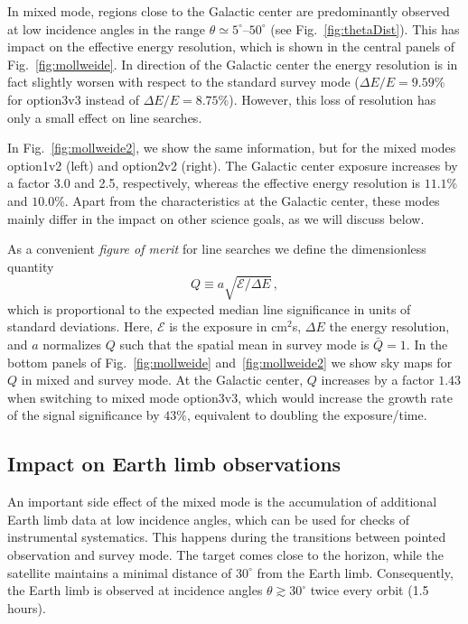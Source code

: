 \documentclass[aps,prd,superscriptaddress,nofootinbib,fixlfloat, 12pt]{revtex4-1}
\begin{document}
In mixed mode, regions close to the Galactic center are predominantly observed
at low incidence angles in the range $\theta\simeq5^\circ$--$50^\circ$ (see
Fig.~\ref{fig:thetaDist}). This has impact on the effective energy resolution,
which is shown in the central panels of Fig.~\ref{fig:mollweide}. In direction
of the Galactic center the energy resolution is in fact slightly worsen with respect to the
standard survey mode ($\Delta E/E=9.59\%$ for option3v3 instead of $\Delta E/E=8.75\%$).
However, this loss of resolution has only a small effect on line searches.

In Fig.~\ref{fig:mollweide2}, we show the same information, but for the mixed
modes option1v2 (left) and option2v2 (right). The Galactic center exposure increases by a
factor 3.0 and 2.5, respectively, whereas the effective energy resolution is
$11.1\%$ and $10.0\%$. Apart from the characteristics at the Galactic center, these modes
mainly differ in the impact on other science goals, as we will discuss below.
\medskip

As a convenient \emph{figure of merit} for line searches we define the
dimensionless quantity $$Q\equiv a\sqrt{\mathcal{E}/\Delta E}\,,$$ which is
proportional to the expected median line significance in units of standard
deviations.  Here, $\mathcal{E}$ is the exposure in cm$^2$s, $\Delta E$ the
energy resolution, and $a$
normalizes $Q$ such that the spatial mean in survey mode is $\bar Q=1$. In the
bottom panels of Fig.~\ref{fig:mollweide} and~\ref{fig:mollweide2} we show sky maps for $Q$ in mixed and
survey mode.  At the Galactic center, $Q$ increases by a factor $1.43$ when
switching to mixed mode option3v3, which would increase the growth rate of
the signal significance by $43\%$, equivalent to doubling the exposure/time. 

\subsection{Impact on Earth limb observations}
An important side effect of the mixed mode is the accumulation of
additional Earth limb data at low incidence angles, which can be used for
checks of instrumental systematics. This happens during the
transitions between pointed observation and survey mode. The target comes
close to the horizon, while the satellite maintains a minimal distance of
$30^\circ$ from the Earth limb. Consequently, the Earth limb is observed at
incidence angles $\theta\gtrsim30^\circ$ twice every orbit (1.5 hours).
\end{document}
